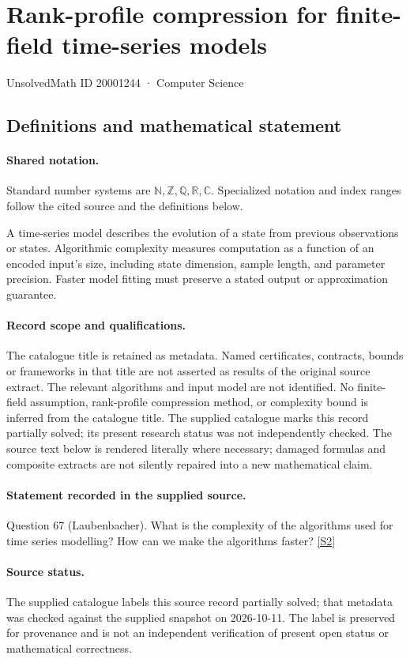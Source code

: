 \documentclass[11pt]{article}
\newcommand{\sref}[2]{\hyperlink{source:#1:#2}{[S#2]}}
\begin{document}
\setcounter{section}{20001243}
\section{Rank-profile compression for finite-field time-series models}\label{20001244}
{\small\sffamily UnsolvedMath ID 20001244 · Computer Science}
\subsection{Definitions and mathematical statement}

\paragraph{Shared notation.}Standard number systems are $\mathbb N,\mathbb Z,\mathbb Q,\mathbb R,\mathbb C$. Specialized notation and index ranges follow the cited source and the definitions below.


A time-series model describes the evolution of a state from previous observations or states. Algorithmic complexity measures computation as a function of an encoded input's size, including state dimension, sample length, and parameter precision. Faster model fitting must preserve a stated output or approximation guarantee.
\paragraph{Record scope and qualifications.}
The catalogue title is retained as metadata. Named certificates, contracts, bounds or frameworks in that title are not asserted as results of the original source extract.
The relevant algorithms and input model are not identified. No finite-field assumption, rank-profile compression method, or complexity bound is inferred from the catalogue title. The supplied catalogue marks this record partially solved; its present research status was not independently checked.
The source text below is rendered literally where necessary; damaged formulas and composite extracts are not silently repaired into a new mathematical claim.
\paragraph{Statement recorded in the supplied source.}
Question 67 (Laubenbacher). What is the complexity of the algorithms used for time series modelling? How can we make the algorithms faster? \sref{20001244}{2}
\paragraph{Source status.}
The supplied catalogue labels this source record partially solved; that metadata was checked against the supplied snapshot on 2026-10-11. The label is preserved for provenance and is not an independent verification of present open status or mathematical correctness.
\end{document}
